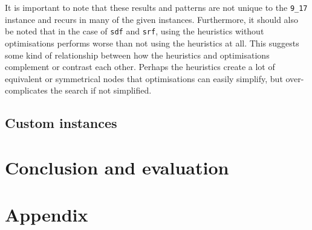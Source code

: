 \documentclass{article}
\begin{document}
\noindent
It is important to note that these results and patterns are not unique to the \texttt{9\_17} instance and recurs in many of the given instances. Furthermore, it should also be noted that in the case of \texttt{sdf} and \texttt{srf}, using the heuristics without optimisations performs worse than not using the heuristics at all. This suggests some kind of relationship between how the heuristics and optimisations complement or contrast each other. Perhaps the heuristics create a lot of equivalent or symmetrical nodes that optimisations can easily simplify, but over-complicates the search if not simplified.

\subsection{Custom instances}


\section{Conclusion and evaluation}


\section{Appendix}




\printbibliography
\end{document}
